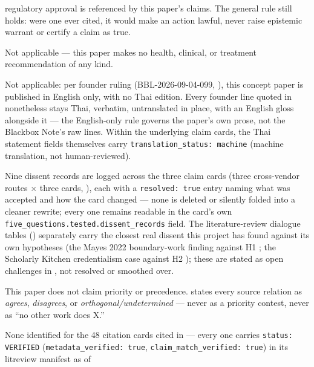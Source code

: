 \begin{disclaimers}
    regulatory approval is referenced by this paper's claims. The general
    rule still holds: were one ever cited, it would make an action lawful,
    never raise epistemic warrant or certify a claim as true.
  \item[D-NOT-DIAGNOSTIC] Not applicable --- this paper makes no health,
    clinical, or treatment recommendation of any kind.
  \item[D-TRANSLATION] Not applicable: per founder ruling
    (BBL-2026-09-04-099, ), this concept paper is
    published in English only, with no Thai edition. Every founder line
    quoted in  nonetheless stays Thai, verbatim,
    untranslated in place, with an English gloss alongside it --- the
    English-only rule governs the paper's own prose, not the Blackbox Note's
    raw lines. Within the underlying claim cards, the Thai statement fields
    themselves carry \texttt{translation\_status: machine} (machine
    translation, not human-reviewed).
  \item[D-DISSENT-PRESERVED] Nine dissent records are logged across the three
    claim cards (three cross-vendor routes $\times$ three cards,
    ), each with a \texttt{resolved: true} entry naming
    what was accepted and how the card changed --- none is deleted or
    silently folded into a cleaner rewrite; every one remains readable in the
    card's own \texttt{five\_questions.tested.dissent\_records} field. The
    literature-review dialogue tables () separately
    carry the closest real dissent this project has found against its own
    hypotheses (the Mayes 2022 boundary-work finding against H1
    \citep{cite-cstp-boundary-work-001}; the Scholarly Kitchen credentialism
    case against H2 \citep{cite-rigour-without-infrastructure-004}); these are
    stated as open challenges in , not resolved or
    smoothed over.
  \item[D-COMPARISON] This paper does not claim priority or precedence.
     states every source relation as \emph{agrees},
    \emph{disagrees}, or \emph{orthogonal/undetermined} --- never as a
    priority contest, never as ``no other work does X.''
  \item[D-CITATION-UNVERIFIED] None identified for the 48 citation cards cited
    in  --- every one carries
    \texttt{status: VERIFIED} (\texttt{metadata\_verified: true},
    \texttt{claim\_match\_verified: true}) in its litreview manifest as of

\end{disclaimers}
